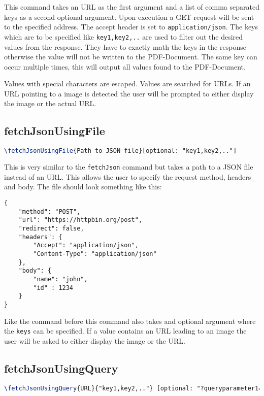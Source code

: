 \documentclass[11pt]{article}
\begin{document}
This command takes an URL as the first argument and a list of comma separated keys as a second optional argument. Upon execution a GET request will be sent to the specified address. The accept header is set to \texttt{application/json}. The keys which are to be specified like \texttt{key1,key2,..} are used to filter out the desired values from the response. They have to exactly math the keys in the response otherwise the value will not be written to the PDF-Document. The same key can occur multiple times, this will output all values found to the PDF-Document.

Values with special characters are escaped. Values are searched for URLs. If an URL pointing to a image is detected the user will be prompted to either display the image or the actual URL.

\subsection{fetchJsonUsingFile}

\begin{lstlisting}[language=tex]
\fetchJsonUsingFile{Path to JSON file}[optional: "key1,key2,.."]
\end{lstlisting}

This is very similar to the \texttt{fetchJson} command but takes a path to a JSON file instead of an URL. This allows the user to specify the request method, headers and body. The file should look something like this:

\begin{lstlisting}
{
    "method": "POST",
    "url": "https://httpbin.org/post",
    "redirect": false,
    "headers": {
        "Accept": "application/json",
        "Content-Type": "application/json"
    },
    "body": {
        "name": "john",
        "id" : 1234
    }
}
\end{lstlisting}

Like the command before this command also takes and optional argument where the \texttt{keys} can be specified. If a value contains an URL leading to an image the user will be asked to either display the image or the URL.

\subsection{fetchJsonUsingQuery}

\begin{lstlisting}[language=tex]
\fetchJsonUsingQuery{URL}{"key1,key2,.."} [optional: "?queryparameter1=value1"] .. [optional: "&queryparameter5=value5"]
\end{lstlisting}
\end{document}
